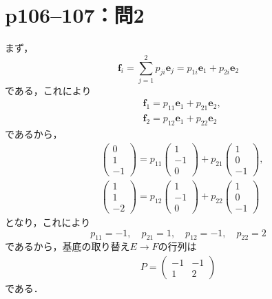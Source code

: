 \documentclass[a4paper,10pt,fleqn]{ltjsarticle}
\begin{document}
\newpage

\section*{p106--107：問2}

\begin{leftbar}
    まず，
    \begin{equation*}
        \bm{f}_i=\sum^{2}_{j=1}p_{ji}\bm{e}_{j}=p_{1i}\bm{e}_1+p_{2i}\bm{e}_2
    \end{equation*}
    である，これにより
    \begin{align*}
         & \bm{f}_1=p_{11}\bm{e}_1+p_{21}\bm{e}_2, \\
         & \bm{f}_2=p_{12}\bm{e}_1+p_{22}\bm{e}_2
    \end{align*}
    であるから，
    \begin{align*}
         &
        \begin{pmatrix}
            0 \\
            1 \\
            -1
        \end{pmatrix}
        =
        p_{11}
        \begin{pmatrix}
            1  \\
            -1 \\
            0
        \end{pmatrix}
        +p_{21}
        \begin{pmatrix}
            1 \\
            0 \\
            -1
        \end{pmatrix}
        ,  \\
         &
        \begin{pmatrix}
            1 \\
            1 \\
            -2
        \end{pmatrix}
        =
        p_{12}
        \begin{pmatrix}
            1  \\
            -1 \\
            0
        \end{pmatrix}
        +p_{22}
        \begin{pmatrix}
            1 \\
            0 \\
            -1
        \end{pmatrix}
    \end{align*}
    となり，これにより
    \[
        p_{11}=-1,\quad p_{21}=1,\quad p_{12}=-1,\quad p_{22}=2
    \]
    であるから，基底の取り替え$E \to F$の行列は
    \begin{align*}
        P=
        \begin{pmatrix}
            -1 & -1 \\
            1  & 2
        \end{pmatrix}
    \end{align*}
    である．
\end{leftbar}
\end{document}
